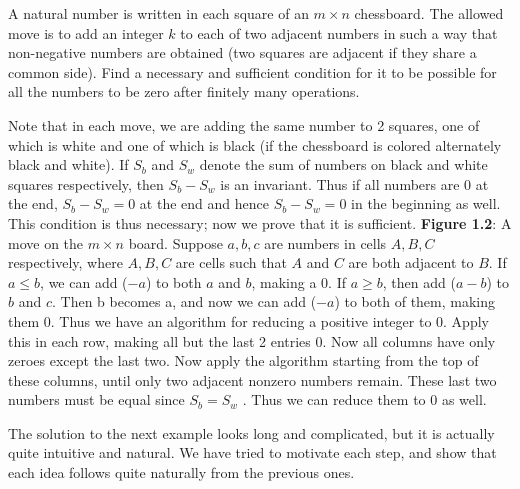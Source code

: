 \documentclass[a4paper,11pt]{book}
\begin{document}
\begin{example} 
A natural number is written in each square of an $m \times n$
chessboard. The allowed move is to add an integer $k$ to each of
two adjacent numbers in such a way that non-negative numbers
are obtained (two squares are adjacent if they share a common
side). Find a necessary and sufficient condition for it to be
possible for all the numbers to be zero after finitely many
operations.
\end{example}
\begin{soln}
Note that in each move, we are adding the same number to 2
squares, one of which is white and one of which is black (if the
chessboard is colored alternately black and white). If $S_b$ and $S_w$
denote the sum of numbers on black and white squares
respectively, then $S_{b} - S_w$ is an invariant. Thus if all numbers are $0$
at the end, $S_b - S_w = 0$ at the end and hence $S_b - S_w = 0$ in the beginning as well. This condition is thus necessary; now we prove
that it is sufficient.
 \textbf{ Figure 1.2}: A move on the $m \times n$ board.
Suppose $a, b, c$ are numbers in cells $A, B, C$ respectively, where
$A, B, C$ are cells such that $A$ and $C$ are both adjacent to $B$. If $a \le b$,
we can add ($-a$) to both $a$ and $b$, making a 0. If $a \ge b$, then add ($a-b$)
to $b$ and $c$. Then b becomes a, and now we can add ($-a$) to both of
them, making them 0. Thus we have an algorithm for reducing a
positive integer to 0. Apply this in each row, making all but the
last 2 entries 0. Now all columns have only zeroes except the last
two. Now apply the algorithm starting from the top of these
columns, until only two adjacent nonzero numbers remain. These
last two numbers must be equal since $S_b = S_w$ . Thus we can reduce
them to 0 as well.
\end{soln}
The solution to the next example looks long and complicated, but
it is actually quite intuitive and natural. We have tried to motivate
each step, and show that each idea follows quite naturally from
the previous ones.\\
\end{document}
